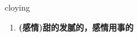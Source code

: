 
\begin{frame}
{\huge cloying}
\begin{center}
\begin{enumerate}\Large
  \item \textbf{(感情)甜的发腻的，感情用事的}
\end{enumerate}
\end{center}
\end{frame}
